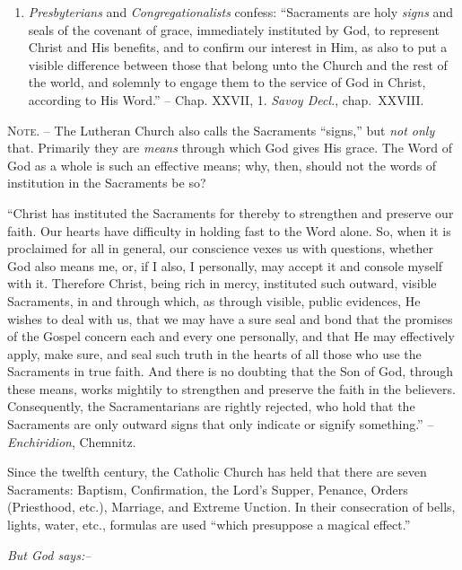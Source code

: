 \documentclass[
]{book}
\begin{document}
\begin{enumerate}
\item
  \emph{Presbyterians} and \emph{Congregationalists} confess: ``Sacraments are holy \emph{signs} and seals of the covenant of grace, immediately instituted by God, to represent Christ and His benefits, and to confirm our interest in Him, as also to put a visible difference between those that belong unto the Church and the rest of the world, and solemnly to engage them to the service of God in Christ, according to His Word.'' -- Chap. XXVII, 1. \emph{Savoy Decl.}, chap.~XXVIII.
\end{enumerate}

\textsc{Note. --} The Lutheran Church also calls the Sacraments ``signs,'' but \emph{not only} that. Primarily they are \emph{means} through which God gives His grace. The Word of God as a whole is such an effective means; why, then, should not the words of institution in the Sacraments be so?

``Christ has instituted the Sacraments for thereby to strengthen and preserve our faith. Our hearts have difficulty in holding fast to the Word alone. So, when it is proclaimed for all in general, our conscience vexes us with questions, whether God also means me, or, if I also, I personally, may accept it and console myself with it. Therefore Christ, being rich in mercy, instituted such outward, visible Sacraments, in and through which, as through visible, public evidences, He wishes to deal with us, that we may have a sure seal and bond that the promises of the Gospel concern each and every one personally, and that He may effectively apply, make sure, and seal such truth in the hearts of all those who use the Sacraments in true faith. And there is no doubting that the Son of God, through these means, works mightily to strengthen and preserve the faith in the believers. Consequently, the Sacramentarians are rightly rejected, who hold that the Sacraments are only outward signs that only indicate or signify something.'' -- \emph{Enchiridion}, Chemnitz.

Since the twelfth century, the Catholic Church has held that there are seven Sacraments: Baptism, Confirmation, the Lord's Supper, Penance, Orders (Priesthood, etc.), Marriage, and Extreme Unction. In their consecration of bells, lights, water, etc., formulas are used ``which presuppose a magical effect.''

\begin{center}
\textsl{But God says:--}
\end{center}
\end{document}
